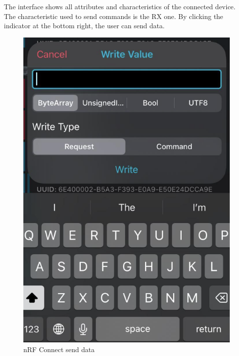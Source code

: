 \documentclass{Configuration_Files/PoliMi3i_thesis}
\begin{document}
The interface shows all attributes and characteristics of the connected device. The characteristic used to send commands is the RX one. By clicking the indicator at the bottom right, the user can send data.

\begin{figure}[H]
    \centering
    \includegraphics[scale=0.6]{Multicentral/13.png}
    \caption{nRF Connect send data}
    \label{multicentral_13}
\end{figure}
\end{document}
